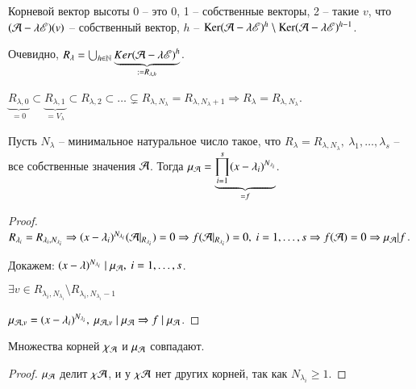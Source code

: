 \documentclass[main]{subfiles}
\begin{document}
Корневой вектор высоты 0 -- это 0, 1 -- собственные векторы, 2 -- такие $v$, что $(\mathcal{A} - \lambda \mathscr{E})(v)$ -- собственный вектор,
$h$ -- $\operatorname{Ker}(\mathcal{A} - \lambda \mathscr{E})^h \setminus \operatorname{Ker}(\mathcal{A} - \lambda \mathscr{E})^{h-1}$.

Очевидно, $R_{\lambda} = \bigcup_{h \in \mathbb{N}} \underbrace{Ker(\mathcal{A} - \lambda \mathscr{E})^h}_{:= R_{\lambda, h}}$.

$\underbrace{R_{\lambda, 0}}_{=0} \subset \underbrace{R_{\lambda, 1}}_{= V_{\lambda}} \subset R_{\lambda, 2} \subset \ldots \subsetneq  R_{\lambda, N_{\lambda}} = R_{\lambda, N_{\lambda} + 1} \Rightarrow
  R_{\lambda} = R_{\lambda, N_{\lambda}}$.

\begin{proposition}
  Пусть $N_{\lambda}$ -- минимальное натуральное число такое, что $R_{\lambda} = R_{\lambda, N_{\lambda}}, \ \lambda_1, \ldots, \lambda_s$ -- все собственные значения $\mathcal{A}$.
  Тогда ${\mu}_{\mathcal{A}} = \underbrace{\prod_{i = 1}^s(x-\lambda_i)^{N_{\lambda_i}}}_{=f}$.
\end{proposition}

\begin{proof}
  $R_{\lambda_i} = R_{\lambda_i, N_{\lambda_i}} \Rightarrow (x - \lambda_i)^{N_{\lambda_i}}(\mathcal{A}|_{R_{\lambda_i}}) = 0 \Rightarrow
    f(\mathcal{A}|_{R_{\lambda_i}}) = 0, \ i = 1, \ldots, s \Rightarrow f(\mathcal{A}) = 0 \Rightarrow \mu_{\mathcal{A}} | f$.

  Докажем: $(x - \lambda)^{N_{\lambda_i}} \mid \mu_{\mathcal{A}}, \ i = 1, \ldots, s$.

  $\exists v \in R_{\lambda_i, N_{\lambda_i}}\setminus R_{\lambda_i, N_{\lambda_i} - 1}$

  $\mu_{\mathcal{A}, v} = (x - \lambda_i)^{N_{\lambda_i}}, \ \mu_{\mathcal{A}, v} \mid \mu_{\mathcal{A}} \Rightarrow f \mid \mu_{\mathcal{A}}$.
\end{proof}

\begin{corollary}
  Множества корней $\chi_{\mathcal{A}}$ и $\mu_{\mathcal{A}}$ совпадают.
\end{corollary}

\begin{proof}
  $\mu_{\mathcal{A}}$ делит $\chi{\mathcal{A}}$, и у $\chi{\mathcal{A}}$ нет других корней, так как $N_{\lambda_i} \geq  1$.
\end{proof}
\end{document}
